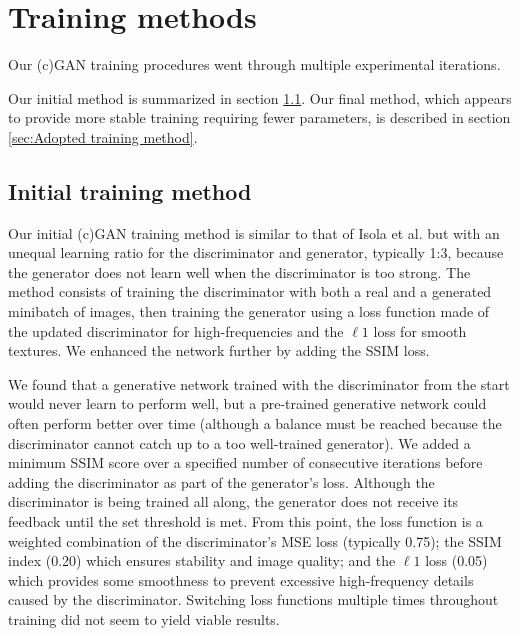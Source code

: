 \section{Training methods}

Our (c)GAN training procedures went through multiple experimental iterations.

Our initial method is summarized in section \ref{sec:Initial training method}. Our final method, which appears to provide more stable training requiring fewer parameters, is described in section \ref{sec:Adopted training method}.

\subsection{Initial training method}\label{sec:Initial training method}
Our initial (c)GAN training method is similar to that of Isola et al. \cite{pix2pix} but with an unequal learning ratio for the discriminator and generator, typically 1:3, because the generator does not learn well when the discriminator is too strong. The method consists of training the discriminator with both a real and a generated minibatch of images, then training the generator using a loss function made of the updated discriminator for high-frequencies and the $\ell 1$ loss for smooth textures. We enhanced the network further by adding the \ac{SSIM} loss.

We found that a generative network trained with the discriminator from the start would never learn to perform well, but a pre-trained generative network could often perform better over time (although a balance must be reached because the discriminator cannot catch up to a too well-trained generator). We added a minimum SSIM score over a specified number of consecutive iterations before adding the discriminator as part of the generator's loss. Although the discriminator is being trained all along, the generator does not receive its feedback until the set threshold is met. From this point, the loss function is a weighted combination of the discriminator's \ac{MSE} loss (typically 0.75); the \ac{SSIM} index (0.20) which ensures stability and image quality; and the $\ell 1$ loss (0.05) which provides some smoothness to prevent excessive high-frequency details caused by the discriminator. Switching loss functions multiple times throughout training did not seem to yield viable results.

